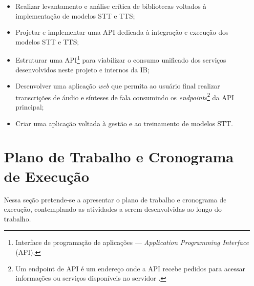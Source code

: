 \documentclass[
	12pt,				%
	a4paper,			%
	english,			%
	brazil,				%
	]{article}
\begin{document}
\begin{itemize}
	\item Realizar levantamento e análise crítica de bibliotecas voltados à implementação de modelos STT e TTS;
	
	\item Projetar e implementar uma API dedicada à integração e execução dos modelos STT e TTS;
	
	\item Estruturar uma API\footnote{Interface de programação de aplicações — \textit{Application Programming Interface} (API).} para viabilizar o consumo unificado dos serviços desenvolvidos neste projeto e internos da IB;
	
	\item Desenvolver uma aplicação \textit{web} que permita ao usuário final realizar transcrições de áudio e sínteses de fala consumindo os \textit{endpoints}\footnote{Um endpoint de API é um endereço onde a API recebe pedidos para acessar informações ou serviços disponíveis no servidor \cite{nosowitz2024}.} da API principal;
	
	\item Criar uma aplicação voltada à gestão e ao treinamento de modelos STT. 
\end{itemize}



    	
\section{Plano de Trabalho e Cronograma de Execução}

Nessa seção pretende-se a apresentar o plano de trabalho e cronograma de execução,
contemplando as atividades a serem desenvolvidas ao longo do trabalho.
\end{document}
